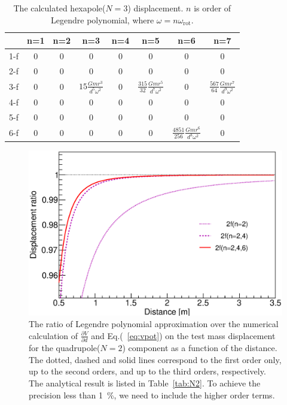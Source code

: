 \documentclass[A4]{spie}  %
\begin{document}
\begin{table}
\begin{center}
\caption{The calculated hexapole($N=3$) displacement. $n$ is order of Legendre polynomial, where $\omega=n\omega_{\mathrm{rot}}$.  \label{tab:N3}}
\footnotesize
\begin{tabular}{cccccccc}
\hline
& n=1 & n=2& n=3 &n=4&n=5&n=6&n=7 \\
\hline
1-f&0&0&0&0&0&0&0 \\
2-f&0&0&0&0&0&0&0  \\
3-f&0&0&$15\frac{Gmr^3}{d^5\omega^2}$&0&$\frac{315}{32}\frac{Gmr^5}{d^7\omega^2}$&0& $\frac{567}{64} \frac{Gmr^7}{d^9 \omega^2}$\\
4-f&0&0&0&0&0&0&0 \\
5-f&0&0&0&0&0&0&0 \\
6-f&0&0&0&0&0&$\frac{4851}{256} \frac{Gmr^6}{d^8\omega^2}$&0  \\
\hline
\end{tabular}
\end{center}
\end{table}

\begin{figure}
\begin{center}
\includegraphics[width=12cm]{2f.eps}
\caption{The ratio of Legendre polynomial approximation over the numerical calculation of $\frac{\partial V}{\partial{d}}$ and Eq.(~\ref{eq:vpot}) 
on the test mass displacement for the quadrupole($N=2$) component as a function of the distance. The dotted, dashed and solid lines correspond to the first order only, up to the second orders, and up to the third orders, respectively.
The analytical result is listed in Table~\ref{tab:N2}. To achieve the precision less than 1~\%, we need to include the higher order terms.}
\label{fig:FEM-2f}
\end{center}
\end{figure}
\end{document}
